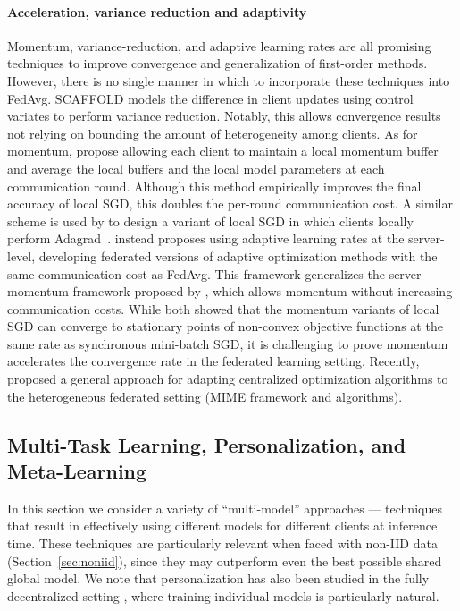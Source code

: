 \paragraph{Acceleration, variance reduction and adaptivity}
Momentum, variance-reduction, and adaptive learning rates are all promising techniques to improve convergence and generalization of first-order methods. However, there is no single manner in which to incorporate these techniques into FedAvg. SCAFFOLD \citep{karimireddy2019scaffold} models the difference in client updates using control variates to perform variance reduction. Notably, this allows convergence results not relying on bounding the amount of heterogeneity among clients. As for momentum, \citet{yu2019linear} propose allowing each client to maintain a local momentum buffer and average the local buffers and the local model parameters at each communication round. Although this method empirically improves the final accuracy of local SGD, this doubles the per-round communication cost. A similar scheme is used by \citet{xie2019local} to design a variant of local SGD in which clients locally perform Adagrad~\citep{mcmahan2010adaptive, duchi2011adaptive}. \citet{reddi2020adaptive} instead proposes using adaptive learning rates at the server-level, developing federated versions of adaptive optimization methods with the same communication cost as FedAvg. This framework generalizes the server momentum framework proposed by \citet{hsu2019measuring,wang2019slowmo}, which allows momentum without increasing communication costs. While both \citep{yu2019linear,wang2019slowmo} showed that the momentum variants of local SGD can converge to stationary points of non-convex objective functions at the same rate as synchronous mini-batch SGD, it is challenging to prove momentum accelerates the convergence rate in the federated learning setting. Recently, \citet{karimireddy2020mime} proposed a general approach for adapting centralized optimization algorithms to the heterogeneous federated setting (MIME framework and algorithms).




\subsection{Multi-Task Learning, Personalization, and Meta-Learning}
\label{sec:multimodel}

In this section we consider a variety of ``multi-model'' approaches --- techniques that result in effectively using different models for different clients at inference time. These techniques are particularly relevant when faced with non-IID data (Section~\ref{sec:noniid}), since they may outperform even the best possible shared global model. We note that personalization has also been studied in the fully decentralized setting \citep{Vanhaesebrouck2017,Bellet2018a,Zantedeschi2019,Almeida2018}, where training individual models is particularly natural.


